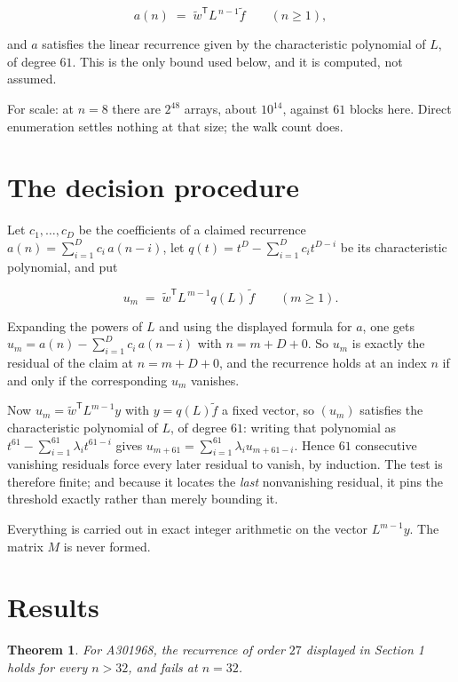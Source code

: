\documentclass[11pt]{article}
\newtheorem{theorem}{Theorem}
\theoremstyle{definition}
\begin{document}
\[a(n) \;=\; \tilde w^{\mathsf T} L^{\,n-1} \tilde f \qquad (n \ge 1),\]

and $a$ satisfies the linear recurrence given by the characteristic polynomial of $L$, of degree $61$. This is the only bound used below, and it is computed, not assumed.

For scale: at $n = 8$ there are $2^{48}$ arrays, about $10^{14}$, against $61$ blocks here. Direct enumeration settles nothing at that size; the walk count does.

\section{The decision procedure}

Let $c_1,\dots,c_D$ be the coefficients of a claimed recurrence $a(n) = \sum_{i=1}^{D} c_i\,a(n-i)$, let $q(t) = t^{D} - \sum_{i=1}^{D} c_i t^{D-i}$ be its characteristic polynomial, and put

\[u_m \;=\; \tilde w^{\mathsf T} L^{\,m-1} q(L)\,\tilde f \qquad (m \ge 1).\]

Expanding the powers of $L$ and using the displayed formula for $a$, one gets $u_m = a(n) - \sum_{i=1}^{D} c_i\,a(n-i)$ with $n = m + D + 0$. So $u_m$ is exactly the residual of the claim at $n = m + D + 0$, and the recurrence holds at an index $n$ if and only if the corresponding $u_m$ vanishes.

Now $u_m = \tilde w^{\mathsf T} L^{m-1} y$ with $y = q(L)\tilde f$ a fixed vector, so $(u_m)$ satisfies the characteristic polynomial of $L$, of degree $61$: writing that polynomial as $t^{61} - \sum_{i=1}^{61} \lambda_i t^{61-i}$ gives $u_{m+61} = \sum_{i=1}^{61} \lambda_i u_{m+61-i}$. Hence $61$ consecutive vanishing residuals force every later residual to vanish, by induction. The test is therefore finite; and because it locates the {\itshape last} nonvanishing residual, it pins the threshold exactly rather than merely bounding it.

Everything is carried out in exact integer arithmetic on the vector $L^{m-1}y$. The matrix $M$ is never formed.

\section{Results}

\begin{theorem} For A301968, the recurrence of order $27$ displayed in Section 1 holds for every $n > 32$, and fails at $n = 32$.\end{theorem}
\end{document}

